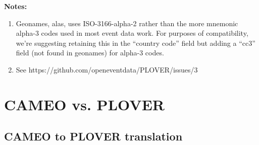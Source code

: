 \documentclass[11pt]{report}
\begin{document}
\begin{table}[htp]
\noindent \textbf{Notes:}
\begin{enumerate}
\item Geonames, alas, uses ISO-3166-alpha-2 rather than the more mnemonic alpha-3 codes used in most event data work. For purposes 
of compatibility, we're suggesting retaining this in the ``country code'' field but adding a ``cc3'' field (not found in geonames) for
alpha-3 codes.
\item See https://github.com/openeventdata/PLOVER/issues/3
\end{enumerate}
\end{table}


\chapter{CAMEO vs. PLOVER}

\section{CAMEO to PLOVER translation}
\end{document}

